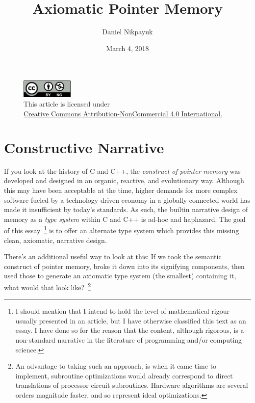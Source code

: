 \documentclass[twoside]{article}
\title{Axiomatic Pointer Memory}
\author{Daniel Nikpayuk}
\date{March 4, 2018}
\begin{document}
\maketitle
\thispagestyle{empty}

\begin{figure}[h]
\centering
\includegraphics[width=1in]{cc-by-nc.png}\\[0.1in]
\tiny This article is licensed under \\
\href{http://creativecommons.org/licenses/by-nc/4.0/}
{Creative Commons Attribution-NonCommercial 4.0 International.}\\[0.3in]
\end{figure}

\section*{Constructive Narrative}

If you look at the history of C and C++, the \emph{construct of pointer memory} was developed and designed in an organic, reactive,
and evolutionary way. Although this may have been acceptable at the time, higher demands for more complex software fueled by
a technology driven economy in a globally connected world has made it insufficient by today's standards. As such, the builtin
narrative design of memory as a \emph{type system} within C and C++ is ad-hoc and haphazard. The goal of this essay~\footnote{I
should mention that I intend to hold the level of mathematical rigour usually presented in an article, but I have otherwise
classified this text as an essay. I have done so for the reason that the content, although rigorous, is a non-standard narrative
in the literature of programming and/or computing science.} is to offer an alternate type system which provides this missing clean,
axiomatic, narrative design.

There's an additional useful way to look at this: If we took the semantic construct of pointer memory, broke it down into its
signifying components, then used those to generate an axiomatic type system (the smallest) containing it, what would that look
like?~\footnote{An advantage to taking such an approach, is when it came time to implement, subroutine optimizations would
already correspond to direct translations of processor circuit subroutines. Hardware algorithms are several orders magnitude
faster, and so represent ideal optimizations.}
\end{document}
